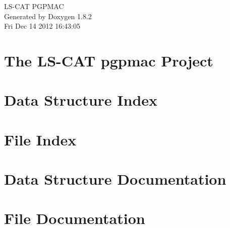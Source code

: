 \documentclass{book}
\begin{document}
\hypersetup{pageanchor=false,citecolor=blue}
\begin{titlepage}
\vspace*{7cm}
\begin{center}
{\Large L\-S-\/\-C\-A\-T P\-G\-P\-M\-A\-C }\\
\vspace*{1cm}
{\large Generated by Doxygen 1.8.2}\\
\vspace*{0.5cm}
{\small Fri Dec 14 2012 16:43:05}\\
\end{center}
\end{titlepage}
\clearemptydoublepage
{}
\tableofcontents
\clearemptydoublepage
{}
\hypersetup{pageanchor=true,citecolor=blue}
\chapter{The L\-S-\/\-C\-A\-T pgpmac Project}
\label{index}\hypertarget{index}{}
\chapter{Data Structure Index}

\chapter{File Index}

\chapter{Data Structure Documentation}



















\chapter{File Documentation}












\printindex
\end{document}

